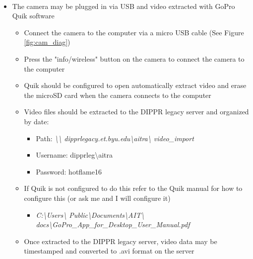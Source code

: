 \documentclass[letterpaper,11pt]{article}
\begin{document}
\begin{itemize}
    \item The camera may be plugged in via USB and video extracted with
        GoPro\textsuperscript{\textcopyright} Quik software
        \begin{itemize}
        \item Connect the camera to the computer via a micro USB cable (See 
            Figure \ref{fig:cam_diag})
        \item Press the "info/wireless" button on the camera to connect the 
            camera to the computer
        \item Quik should be configured to open automatically extract video and 
            erase the microSD card when the camera connects to the computer
        \item Video files should be extracted to the DIPPR legacy server and 
            organized by date:
            \begin{itemize}
            \item Path: \textit{\textbackslash \textbackslash 
               dipprlegacy.et.byu.edu\textbackslash aitra\textbackslash 
               video\_import}
            \item Username: dipprleg\textbackslash aitra
            \item Password: hotflame16
            \end{itemize}
        \item If Quik is not configured to do this refer to the Quik manual for
            how to configure this (or ask me and I will configure it)
            \begin{itemize}
            \item \textit{C:\textbackslash Users\textbackslash 
            Public\textbackslash Documents\textbackslash AIT\textbackslash 
            docs\textbackslash GoPro\_App\_for\_Desktop\_User\_Manual.pdf}
            \end{itemize}
        \item Once extracted to the DIPPR legacy server, video data may be 
            timestamped and converted to .avi format on the server
        \end{itemize}
        

\end{itemize}
\end{document}
